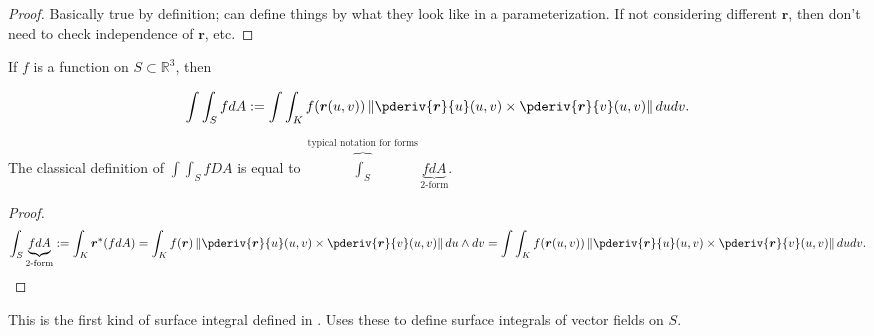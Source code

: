 \begin{proof}

Basically true by definition; can define things by what they look like in a parameterization. If not considering different \(\boldsymbol{r}\), then don't need to check independence of \(\boldsymbol{r}\), etc.

\end{proof}

\begin{definition}

If \(f\) is a function on \(S \subset \mathbb{R}^3\), then 

\[
\int \int_S f dA := \int\int_K f(\boldsymbol{r}(u,v)) \left\lVert \pderiv{\boldsymbol{r}}{u}(u,v) \times \pderiv{\boldsymbol{r}}{v}(u,v) \right\rVert du dv.
\]

\end{definition}

\begin{proposition}

The classical definition of \(\int\int_S f DA\) is equal to \(\overbrace{\int_S}^{\text{typical notation for forms}} \underbrace{f dA}_{\text{2-form}}\).

\end{proposition}

\begin{proof}

\[
\int_S \underbrace{f dA}_{\text{2-form}} := \int_K \boldsymbol{r}^*(f dA) = \int_K f(\boldsymbol{r}) \left\lVert \pderiv{\boldsymbol{r}}{u}(u,v) \times \pderiv{\boldsymbol{r}}{v}(u,v) \right\rVert  du \wedge dv = \int\int_K f(\boldsymbol{r}(u,v)) \left\lVert \pderiv{\boldsymbol{r}}{u}(u,v) \times \pderiv{\boldsymbol{r}}{v}(u,v) \right\rVert du dv.
\]

\end{proof}

This is the first kind of surface integral defined in \citet{stewart2015calculus}. \citet{stewart2015calculus} Uses these to define surface integrals of vector fields on \(S\).


